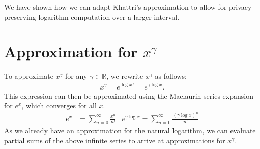 We have shown how we can adapt Khattri's approximation to allow for privacy-preserving logarithm computation over a larger interval.

\section{Approximation for $x^\gamma$}
\label{sec:power_approximation}
To approximate $x^\gamma$ for any $\gamma \in \mathbb{R}$, we rewrite $x^\gamma$ as follows:
\begin{align*}
  x^\gamma = e^{\log{x^\gamma}} = e^{\gamma\log{x}}.
\end{align*}
This expression can then be approximated using the Maclaurin series expansion for $e^x$, which converges for all $x$.
\begin{align*}
  e^x &= \sum_{n=0}^{\infty}{\frac{x^n}{n!}}
  &e^{\gamma\log{x}} = \sum_{n=0}^{\infty}{\frac{(\gamma\log{x})^n}{n!}}
\end{align*}
As we already have an approximation for the natural logarithm, we can evaluate partial sums of the above infinite series to arrive at approximations for $x^\gamma$.
